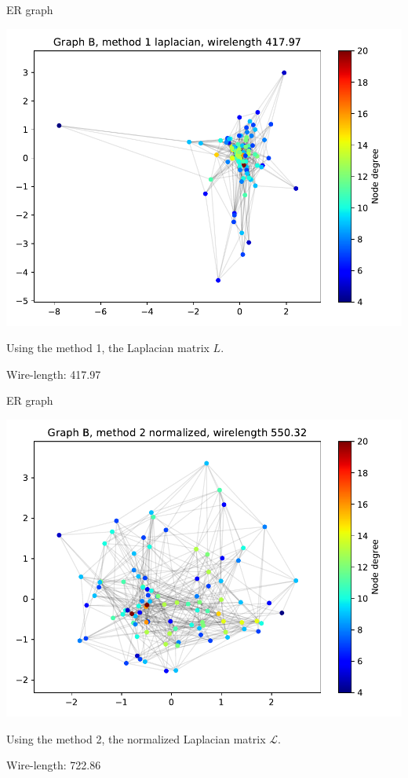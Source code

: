 \documentclass[serif, 12pt]{beamer}
\begin{document}
\begin{frame}{ER graph}
\begin{center}
\includegraphics[scale=0.5]{B/laplacian.pdf}
\end{center}
Using the method 1, the Laplacian matrix $L$.

Wire-length: 417.97
\end{frame}

\begin{frame}{ER graph}
\begin{center}
\includegraphics[scale=0.5]{B/norm.pdf}
\end{center}
Using the method 2, the normalized Laplacian matrix $\mathcal L$.

Wire-length: 722.86
\end{frame}
\end{document}
